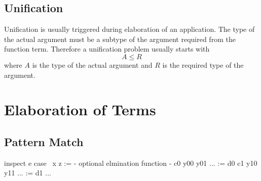 \subsection{Unification}

Unification is usually triggered during elaboration of an application. The type
of the actual argument must be a subtype of the argument required from the
function term. Therefore a unification problem usually starts with
$$
    A \le R
$$
where $A$ is the type of the actual argument and $R$ is the required type of the
argument.















\section{Elaboration of Terms}



\subsection{Pattern Match}


\begin{alba}
    inspect e case
        {\ {x} z :=
            {- optional elmination function -}
        }
        c0 y00 y01 ... := d0
        c1 y10 y11 ... := d1
        ...
\end{alba}





